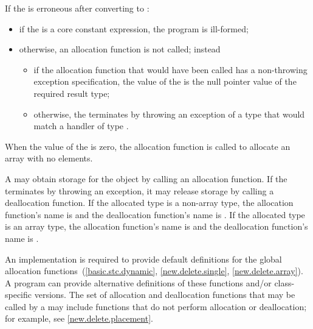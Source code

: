 If the  is erroneous after converting to :
\begin{itemize}
\item
if the  is a core constant expression,
the program is ill-formed;
\item
otherwise, an allocation function is not called; instead
\begin{itemize}
\item
if the allocation function that would have been called
has a non-throwing exception specification,
the value of the 
is the null pointer value of the required result type;
\item
otherwise, the  terminates by throwing an
exception of a type that would match a handler of type
.
\end{itemize}
\end{itemize}
When the value of the  is zero, the allocation
function is called to allocate an array with no elements.

\pnum
A  may obtain storage for the object by calling an
allocation function. If
the  terminates by throwing an exception, it
may release storage by calling a deallocation
function. If the allocated type
is a non-array type, the allocation function's name is
%
%
 and the deallocation function's name is
. If the allocated type is an array type, the
allocation function's name is
%
%
and the deallocation function's name is
.
\begin{note}
An implementation is required to provide default definitions for the global
allocation
functions~(\ref{basic.stc.dynamic}, \ref{new.delete.single}, \ref{new.delete.array}).
A \Cpp{} program can provide alternative definitions of
these functions and/or class-specific
versions.
The set of allocation and deallocation functions that may be called
by a 
may include functions that do not perform allocation or deallocation;
for example, see \ref{new.delete.placement}.
\end{note}

